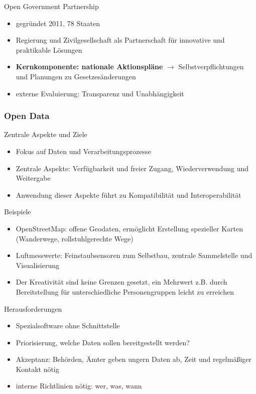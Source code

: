 Open Government Partnership

\begin{itemize}
  \item gegründet 2011, 78 Staaten
  \item Regierung und Zivilgesellschaft als Partnerschaft für innovative und praktikable Lösungen
  \item \textbf{Kernkomponente: nationale Aktionspläne} $\rightarrow$ Selbstverpflichtungen und Planungen zu Gesetzesänderungen
  \item externe Evaluierung: Transparenz und Unabhängigkeit
\end{itemize}

\subsubsection{Open Data}
Zentrale Aspekte und Ziele

\begin{itemize}
  \item Fokus auf Daten und Verarbeitungsprozesse
  \item Zentrale Aspekte: Verfügbarkeit und freier Zugang, Wiederverwendung und Weitergabe
  \item Anwendung dieser Aspekte führt zu Kompatibilität und Interoperabilität
\end{itemize}

Beispiele

\begin{itemize}
  \item OpenStreetMap: offene Geodaten, ermöglicht Erstellung spezieller Karten (Wanderwege, rollstuhlgerechte Wege)
  \item Luftmesswerte: Feinstaubsensoren zum Selbstbau, zentrale Sammelstelle und Visualisierung
  \item Der Kreativität sind keine Grenzen gesetzt, ein Mehrwert z.B. durch Bereitstellung für unterschiedliche Personengruppen leicht zu erreichen
\end{itemize}

\clearpage
Herausforderungen

\begin{itemize}
  \item Spezialsoftware ohne Schnittstelle
  \item Priorisierung, welche Daten sollen bereitgestellt werden?
  \item Akzeptanz: Behörden, Ämter geben ungern Daten ab, Zeit und regelmäßiger Kontakt nötig
  \item interne Richtlinien nötig: wer, was, wann
\end{itemize}

